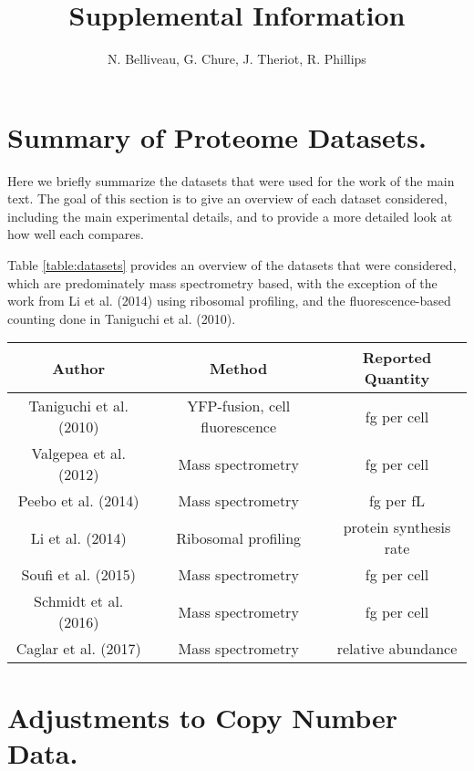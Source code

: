 \documentclass[11pt]{article}
\author{N. Belliveau, G. Chure, J. Theriot, R. Phillips}
\begin{document}
\title{Supplemental Information}
\maketitle

\section{Summary of Proteome Datasets.}

Here we briefly summarize the datasets that were used for the work of the
main text. The goal of this section is to give an overview of each
dataset considered, including the main experimental details, and to provide a
more detailed look at how well each compares.

Table \ref{table:datasets} provides an overview of the datasets that were considered,
which are predominately mass spectrometry based, with the exception of the work from Li et al. (2014)
using ribosomal profiling, and the fluorescence-based counting done in Taniguchi et al. (2010).


\begin{center}
\begin{tabular}{ || c | c | c || }
\hline
Author & Method & Reported Quantity \\
\hline\hline
Taniguchi et al. (2010) & YFP-fusion, cell fluorescence & fg per cell \\
\hline
Valgepea et al. (2012) & Mass spectrometry & fg per cell \\
\hline
Peebo et al. (2014) & Mass spectrometry & fg per fL \\
\hline
Li et al. (2014) & Ribosomal profiling & protein synthesis rate \\
\hline
Soufi et al. (2015) & Mass spectrometry & fg per cell \\
\hline
Schmidt et al. (2016) & Mass spectrometry & fg per cell \\
\hline
Caglar et al. (2017) & Mass spectrometry & relative abundance \\
\hline
\end{tabular}
\label{table:datasets}
\end{center}

\section{Adjustments to Copy Number Data.}

%
\end{document}
